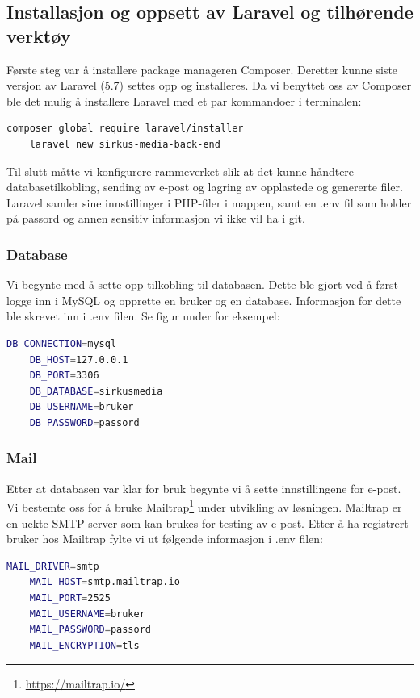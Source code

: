 \subsection{Installasjon og oppsett av Laravel og tilhørende verktøy}
Første steg var å installere package manageren Composer. Deretter kunne siste versjon av Laravel (5.7) settes opp og installeres. Da vi benyttet oss av Composer ble det mulig å installere Laravel med et par kommandoer i terminalen:
\begin{lstlisting}[caption={Installasjon av Laravel med Composer},language=bash]
    composer global require laravel/installer
    laravel new sirkus-media-back-end
\end{lstlisting}

Til slutt måtte vi konfigurere rammeverket slik at det kunne håndtere databasetilkobling, sending av e-post og lagring av opplastede og genererte filer. Laravel samler sine innstillinger i PHP-filer i  mappen, samt en .env fil som holder på passord og annen sensitiv informasjon vi ikke vil ha i git.

\subsubsection{Database}
Vi begynte med å sette opp tilkobling til databasen. Dette ble gjort ved å først logge inn i MySQL og opprette en bruker og en database. Informasjon for dette ble skrevet inn i .env filen. Se figur under for eksempel:
\begin{lstlisting}[caption={Laravel .env database secrets},language=bash]
    DB_CONNECTION=mysql
    DB_HOST=127.0.0.1
    DB_PORT=3306
    DB_DATABASE=sirkusmedia
    DB_USERNAME=bruker
    DB_PASSWORD=passord
\end{lstlisting}

\subsubsection{Mail}
Etter at databasen var klar for bruk begynte vi å sette innstillingene for e-post. Vi bestemte oss for å bruke Mailtrap\footnote{\url{https://mailtrap.io/}} under utvikling av løsningen. Mailtrap\cite{mailtrap2019setfsad} er en uekte SMTP-server som kan brukes for testing av e-post. Etter å ha registrert bruker hos Mailtrap fylte vi ut følgende informasjon i .env filen:
\begin{lstlisting}[caption={Laravel .env mail secrets}, language=bash]
    MAIL_DRIVER=smtp
    MAIL_HOST=smtp.mailtrap.io
    MAIL_PORT=2525
    MAIL_USERNAME=bruker
    MAIL_PASSWORD=passord
    MAIL_ENCRYPTION=tls
\end{lstlisting}

